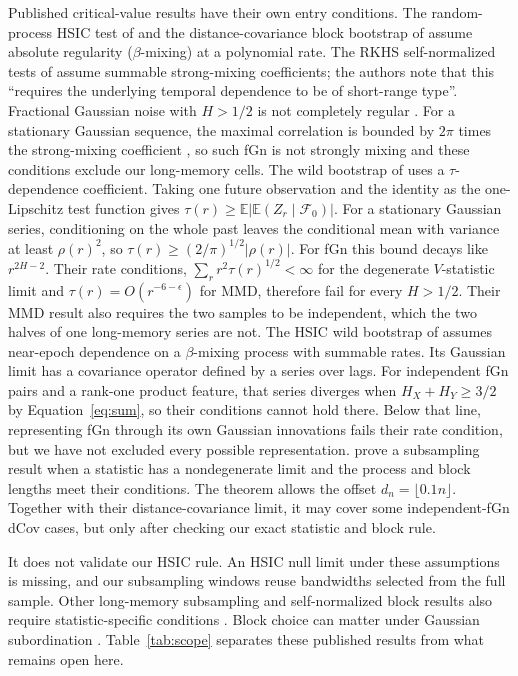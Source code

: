 \documentclass[11pt]{article}
\theoremstyle{remark}
\newcommand{\E}{\mathbb E}
\begin{document}
Published critical-value results have their own entry conditions. The random-process HSIC test of \citet{chwialkowski2014random} and the distance-covariance block bootstrap of \citet{betken2024bootstrap} assume absolute regularity ($\beta$-mixing) at a polynomial rate. The RKHS self-normalized tests of \citet{ghoshal2026rkhs} assume summable strong-mixing coefficients; the authors note that this ``requires the underlying temporal dependence to be of short-range type''. Fractional Gaussian noise with $H>1/2$ is not completely regular \citep[Example~1]{betken2018subsampling}. For a stationary Gaussian sequence, the maximal correlation is bounded by $2\pi$ times the strong-mixing coefficient \citep[Section~7]{bradley2005mixing}, so such fGn is not strongly mixing and these conditions exclude our long-memory cells. The wild bootstrap of \citet{chwialkowski2014wild} uses a $\tau$-dependence coefficient. Taking one future observation and the identity as the one-Lipschitz test function gives $\tau(r)\geq\E|\E(Z_r\mid\mathcal F_0)|$. For a stationary Gaussian series, conditioning on the whole past leaves the conditional mean with variance at least $\rho(r)^2$, so $\tau(r)\geq(2/\pi)^{1/2}|\rho(r)|$. For fGn this bound decays like $r^{2H-2}$. Their rate conditions, $\sum_r r^2\tau(r)^{1/2}<\infty$ for the degenerate $V$-statistic limit and $\tau(r)=O(r^{-6-\epsilon})$ for MMD, therefore fail for every $H>1/2$. Their MMD result also requires the two samples to be independent, which the two halves of one long-memory series are not. The HSIC wild bootstrap of \citet{dizcastro2026hsic} assumes near-epoch dependence on a $\beta$-mixing process with summable rates. Its Gaussian limit has a covariance operator defined by a series over lags. For independent fGn pairs and a rank-one product feature, that series diverges when $H_X+H_Y\geq3/2$ by Equation~\eqref{eq:sum}, so their conditions cannot hold there. Below that line, representing fGn through its own Gaussian innovations fails their rate condition, but we have not excluded every possible representation. \citet[Theorem 2.4]{betken2021ldr} prove a subsampling result when a statistic has a nondegenerate limit and the process and block lengths meet their conditions. The theorem allows the offset $d_n=\lfloor0.1n\rfloor$. Together with their distance-covariance limit, it may cover some independent-fGn dCov cases, but only after checking our exact statistic and block rule.

It does not validate our HSIC rule. An HSIC null limit under these assumptions is missing, and our subsampling windows reuse bandwidths selected from the full sample. Other long-memory subsampling and self-normalized block results also require statistic-specific conditions \citep{betken2018subsampling,bai2016snbs}. Block choice can matter under Gaussian subordination \citep{zhang2022optimalblock}. Table~\ref{tab:scope} separates these published results from what remains open here.
\end{document}
